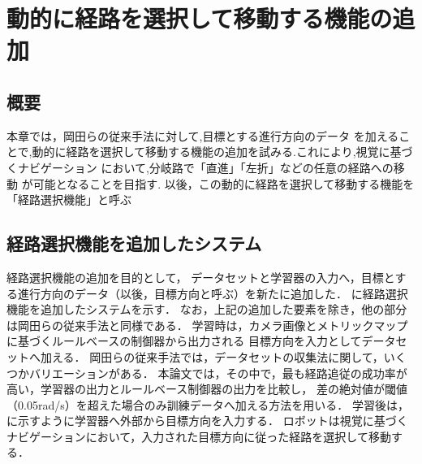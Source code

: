 \chapter{動的に経路を選択して移動する機能の追加}
\label{chap:path_select}

\section{概要}
本章では，岡田らの従来手法に対して,目標とする進行方向のデータ
を加えることで,動的に経路を選択して移動する機能の追加を試みる.これにより,視覚に基づくナビゲーション
において,分岐路で「直進」「左折」などの任意の経路への移動
が可能となることを目指す.
以後，この動的に経路を選択して移動する機能を「経路選択機能」と呼ぶ
% 
% 
% 

\section{経路選択機能を追加したシステム}
経路選択機能の追加を目的として，
データセットと学習器の入力へ，目標とする進行方向のデータ（以後，目標方向と呼ぶ）を新たに追加した．
に経路選択機能を追加したシステムを示す．
なお，上記の追加した要素を除き，他の部分は岡田らの従来手法と同様である．
学習時は，カメラ画像とメトリックマップに基づくルールベースの制御器から出力される
目標方向を入力としてデータセットへ加える．
岡田らの従来手法では，データセットの収集法に関して，いくつかバリエーションがある．
本論文では，その中で，最も経路追従の成功率が高い，学習器の出力とルールベース制御器の出力を比較し，
差の絶対値が閾値（0.05rad/s）を超えた場合のみ訓練データへ加える方法\cite{okada2021}を用いる．
学習後は，に示すように学習器へ外部から目標方向を入力する．
ロボットは視覚に基づくナビゲーションにおいて，入力された目標方向に従った経路を選択して移動する．


